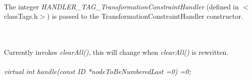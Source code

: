  \\


 \\
\\ 
The integer {\em HANDLER\_TAG\_TransformationConstraintHandler} (defined in
$<$classTags.h$>$) is passed to the TransformationConstraintHandler
constructor. 

 \\
\\ 
Currently invokes {\em clearAll()}, this will change when {\em
clearAll()} is rewritten. \\

\\
{\em virtual int handle(const ID *nodeToBeNumberedLast =0) =0;} 

